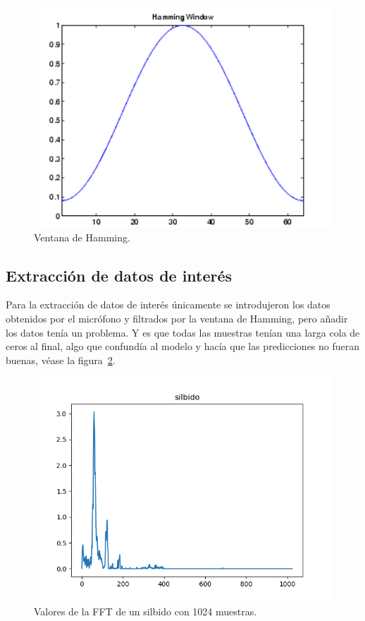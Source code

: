 \documentclass[a4paper, 12pt]{book}
\begin{document}
\begin{figure}
	\centering
	\includegraphics[width=12cm, keepaspectratio]{img/hamming-window.png}
	\caption{Ventana de Hamming.}\label{fig:hamming-window}
\end{figure}

\subsection{Extracción de datos de interés}
\label{subsec:extraccion-datos}

Para la extracción de datos de interés únicamente se introdujeron los datos obtenidos por el micrófono y filtrados por la ventana de Hamming, pero añadir los datos tenía un problema. Y es que todas las muestras tenían una larga cola de ceros al final, algo que confundía al modelo y hacía que las predicciones no fueran buenas, véase la figura~\ref{fig:silbido1024}.

\begin{figure}
	\centering
	\includegraphics[width=12cm, keepaspectratio]{img/silbido1024.png}
	\caption{Valores de la FFT de un silbido con 1024 muestras.}\label{fig:silbido1024}
\end{figure}
\end{document}
